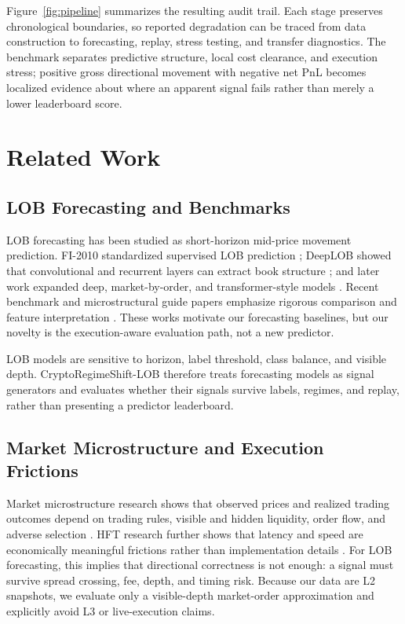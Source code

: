 \documentclass[conference]{IEEEtran}
\begin{document}
Figure~\ref{fig:pipeline} summarizes the resulting audit trail. Each stage preserves chronological boundaries, so reported degradation can be traced from data construction to forecasting, replay, stress testing, and transfer diagnostics. The benchmark separates predictive structure, local cost clearance, and execution stress; positive gross directional movement with negative net PnL becomes localized evidence about where an apparent signal fails rather than merely a lower leaderboard score.

\section{Related Work}
\subsection{LOB Forecasting and Benchmarks}
LOB forecasting has been studied as short-horizon mid-price movement prediction. FI-2010 standardized supervised LOB prediction \cite{ntakaris2018benchmark}; DeepLOB showed that convolutional and recurrent layers can extract book structure \cite{deeplob2019}; and later work expanded deep, market-by-order, and transformer-style models \cite{sirignano2019deeplob,zhang2021marketbyorder,xiao2025lit}. Recent benchmark and microstructural guide papers emphasize rigorous comparison and feature interpretation \cite{prata2024lobbenchmark,briola2025lobframe}. These works motivate our forecasting baselines, but our novelty is the execution-aware evaluation path, not a new predictor.

LOB models are sensitive to horizon, label threshold, class balance, and visible depth. CryptoRegimeShift-LOB therefore treats forecasting models as signal generators and evaluates whether their signals survive labels, regimes, and replay, rather than presenting a predictor leaderboard.

\subsection{Market Microstructure and Execution Frictions}
Market microstructure research shows that observed prices and realized trading outcomes depend on trading rules, visible and hidden liquidity, order flow, and adverse selection \cite{madhavan2000microstructure,ohara2015highfrequency,cont2010stochasticlob,cartea2015algorithmic}. HFT research further shows that latency and speed are economically meaningful frictions rather than implementation details \cite{budish2015hftarmsrace,aquilina2022armsrace,aquilina2025speedpremium}. For LOB forecasting, this implies that directional correctness is not enough: a signal must survive spread crossing, fee, depth, and timing risk. Because our data are L2 snapshots, we evaluate only a visible-depth market-order approximation and explicitly avoid L3 or live-execution claims.
\end{document}
